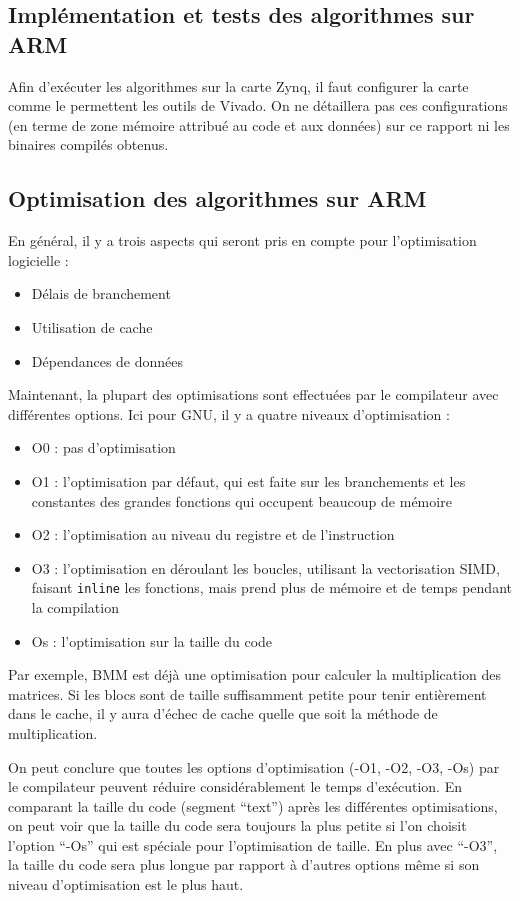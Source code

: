\documentclass[12pt,a4paper]{article}
\begin{document}
\subsection{Implémentation et tests des algorithmes sur ARM}
Afin d'exécuter les algorithmes sur la carte Zynq, il faut configurer la carte comme le permettent les outils de Vivado. On ne détaillera pas ces configurations (en terme de zone mémoire attribué au code et aux données) sur ce rapport ni les binaires compilés obtenus.

\subsection{Optimisation des algorithmes sur ARM}
En général, il y a trois aspects qui seront pris en compte pour l’optimisation logicielle :
\begin{itemize}
\item Délais de branchement
\item Utilisation de cache
\item Dépendances de données
\end{itemize}
Maintenant, la plupart des optimisations sont effectuées par le compilateur avec différentes options. Ici pour GNU, il y a quatre niveaux d’optimisation :
\begin{itemize}
\item O0 : pas d’optimisation
\item O1 : l’optimisation par défaut, qui est faite sur les branchements et les constantes des grandes fonctions qui occupent beaucoup de mémoire
\item  O2 : l’optimisation au niveau du registre et de l’instruction 
\item O3 : l’optimisation en déroulant les boucles, utilisant la vectorisation SIMD, faisant \texttt{inline} les fonctions, mais prend plus de mémoire et de temps pendant la compilation
\item Os : l’optimisation sur la taille du code
\end{itemize}

Par exemple, BMM est déjà une optimisation pour calculer la multiplication des matrices. Si les blocs sont de taille suffisamment petite pour tenir entièrement dans le cache, il y aura d’échec de cache quelle que soit la méthode de multiplication.

On peut conclure que toutes les options d'optimisation (-O1, -O2, -O3, -Os) par le compilateur peuvent réduire considérablement le temps d'exécution. En comparant la taille du code (segment “text”) après les différentes optimisations, on peut voir que la taille du code sera toujours la plus petite si l’on choisit l’option “-Os” qui est spéciale pour l’optimisation de taille. En plus avec “-O3”, la taille du code sera plus longue par rapport à d'autres options même si son niveau d’optimisation est le plus haut.
\end{document}
